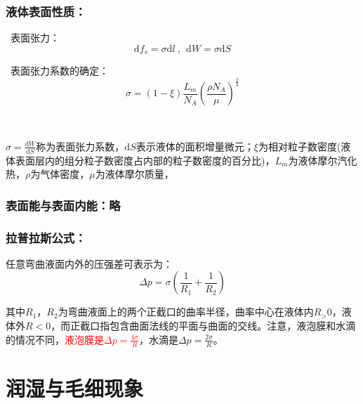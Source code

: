 \documentclass[zihao=-4,UTF8]{report}
\begin{document}
\subsubsection{液体表面性质：}
\par{}\ 表面张力：
\begin{equation}
    \mathrm{d}f_s = \sigma\mathrm{d}l\ ,\ \ \mathrm{d}W = \sigma \mathrm{d}S
\end{equation} \par
{}\  表面张力系数的确定：
\begin{equation}
    \sigma = (1 - \xi )\frac{L_m}{N_A}\left(\frac{\rho N_A}{\mu}\right)^{\frac{2}{3}}
\end{equation}   \par
{}\     \par
{\par\color{gray}\small
$\sigma = \frac{\mathrm{d}W}{\mathrm{d}S}$称为表面张力系数，$\mathrm{d}S$表示液体的面积增量微元；$\xi$为相对粒子数密度(液体表面层内的组分粒子数密度占内部的粒子数密度的百分比)，$L_m$为液体摩尔汽化热，$\rho$为气体密度，$\mu$为液体摩尔质量，
\par}

\subsubsection{表面能与表面内能：略}
\subsubsection{拉普拉斯公式：}
任意弯曲液面内外的压强差可表示为：
\begin{equation}
    \Delta p = \sigma(\frac{1}{R_1} + \frac{1}{R_2})
\end{equation}
{\par\color{gray}\small
其中$R_1$，$R_2$为弯曲液面上的两个正截口的曲率半径，曲率中心在液体内$R_> 0$，液体外$R<0$，而正截口指包含曲面法线的平面与曲面的交线。注意，液泡膜和水滴的情况不同，\textcolor{red}{液泡膜是$\Delta p = \frac{4\sigma}{R}$}，水滴是$\Delta p = \frac{2\sigma}{R}$。
\par}

\section{润湿与毛细现象}
\end{document}
